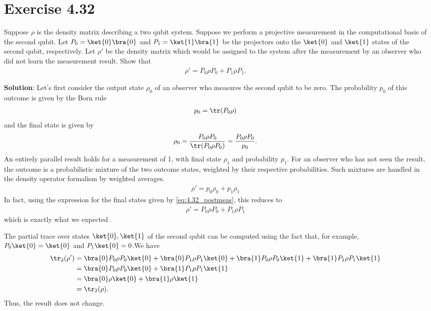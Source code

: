 \documentclass{book}
\begin{document}
\section*{Exercise 4.32}
    Suppose $\rho$ is the density matrix describing a two qubit system. Suppose we perform a projective measurement in the computational basis of the second qubit. Let $P_0 = \ket{0}\bra{0}$ and $P_1 = \ket{1}\bra{1}$ be the projectors onto the $\ket{0}$ and $\ket{1}$ states of the second qubit, respectively. Let $\rho'$ be the density matrix which would be assigned to the system after the measurement by an observer who did not learn the measurement result. Show that
    \begin{align}
        \rho' = P_0 \rho P_0 + P_1 \rho P_1.
    \end{align}

    \textbf{Solution}: Let's first consider the output state $\rho_0$ of an observer who measures the second qubit to be zero. The probability $p_0$ of this outcome is given by the Born rule
    \begin{align}
        p_0 = \tr(P_0 \rho)
    \end{align}
    and the final state is given by
    \begin{align} \label{eq:4.32_postmeas}
        \rho_0 = \frac{P_0 \rho P_0}{\tr(P_0 \rho P_0)} = \frac{P_0 \rho P_0}{p_0}.
    \end{align}
    An entirely parallel result holds for a measurement of 1, with final state $\rho_1$ and probability $p_1$. For an observer who has not seen the result, the outcome is a probabilistic mixture of the two outcome states, weighted by their respective probabilities. Such mixtures are handled in the density operator formalism by weighted averages.
    \begin{align}
        \rho' = p_0 \rho_0 + p_1 \rho_1
    \end{align}
    In fact, using the expression for the final states given by \eqref{eq:4.32_postmeas}, this reduces to 
    \begin{align}
        \rho' = P_0 \rho P_0 + P_1 \rho P_1
    \end{align}
    which is exactly what we expected. 

    The partial trace over states $\ket{0}, \ket{1}$ of the second qubit can be computed using the fact that, for example, $P_0 \ket{0} = \ket{0}$ and $P_1 \ket{0} = 0$.We have
    \begin{align}
    \begin{aligned}
        \tr_2(\rho') &= \bra{0}P_0 \rho P_0 \ket{0} + \bra{0}P_1 \rho P_1 \ket{0} + \bra{1}P_0 \rho P_0 \ket{1} + \bra{1}P_1 \rho P_1 \ket{1} \\
        &= \bra{0}P_0 \rho P_0 \ket{0} + \bra{1}P_1 \rho P_1 \ket{1} \\
        &= \bra{0}\rho\ket{0} + \bra{1}\rho\ket{1} \\
        &=\tr_2(\rho).
    \end{aligned}
    \end{align}
    Thus, the result does not change. 
\end{document}
